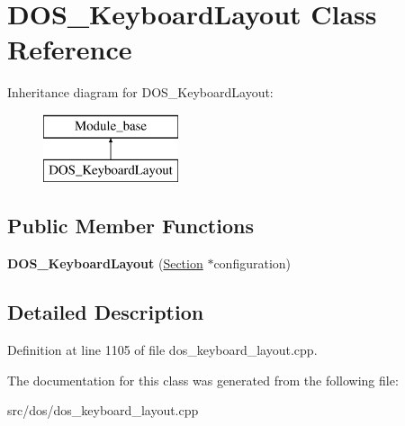\hypertarget{classDOS__KeyboardLayout}{\section{D\-O\-S\-\_\-\-Keyboard\-Layout Class Reference}
\label{classDOS__KeyboardLayout}
}
Inheritance diagram for D\-O\-S\-\_\-\-Keyboard\-Layout\-:\begin{figure}[H]
\begin{center}
\leavevmode
\includegraphics[height=2.000000cm]{classDOS__KeyboardLayout}
\end{center}
\end{figure}
\subsection*{Public Member Functions}
\begin{DoxyCompactItemize}
\item 
\hypertarget{classDOS__KeyboardLayout_a794faca95d191a599d107822832a037d}{{\bfseries D\-O\-S\-\_\-\-Keyboard\-Layout} (\hyperlink{classSection}{Section} $\ast$configuration)}\label{classDOS__KeyboardLayout_a794faca95d191a599d107822832a037d}

\end{DoxyCompactItemize}


\subsection{Detailed Description}


Definition at line 1105 of file dos\-\_\-keyboard\-\_\-layout.\-cpp.



The documentation for this class was generated from the following file\-:\begin{DoxyCompactItemize}
\item 
src/dos/dos\-\_\-keyboard\-\_\-layout.\-cpp\end{DoxyCompactItemize}
